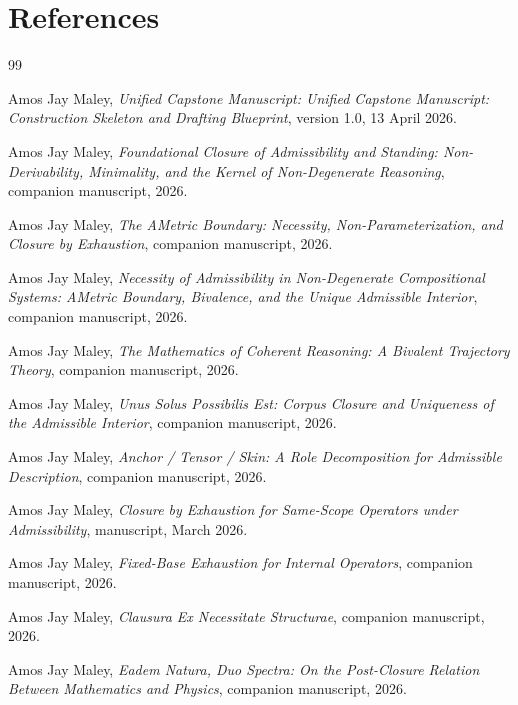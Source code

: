 \section{References}
\begin{thebibliography}{99}

Amos Jay Maley,
\newblock \emph{Unified Capstone Manuscript: Unified Capstone Manuscript: Construction Skeleton and Drafting Blueprint},
\newblock version 1.0, 13 April 2026.

Amos Jay Maley,
\newblock \emph{Foundational Closure of Admissibility and Standing: Non-Derivability, Minimality, and the Kernel of Non-Degenerate Reasoning},
\newblock companion manuscript, 2026.

Amos Jay Maley,
\newblock \emph{The AMetric Boundary: Necessity, Non-Parameterization, and Closure by Exhaustion},
\newblock companion manuscript, 2026.

Amos Jay Maley,
\newblock \emph{Necessity of Admissibility in Non-Degenerate Compositional Systems: AMetric Boundary, Bivalence, and the Unique Admissible Interior},
\newblock companion manuscript, 2026.

Amos Jay Maley,
\newblock \emph{The Mathematics of Coherent Reasoning: A Bivalent Trajectory Theory},
\newblock companion manuscript, 2026.

Amos Jay Maley,
\newblock \emph{Unus Solus Possibilis Est: Corpus Closure and Uniqueness of the Admissible Interior},
\newblock companion manuscript, 2026.

Amos Jay Maley,
\newblock \emph{Anchor / Tensor / Skin: A Role Decomposition for Admissible Description},
\newblock companion manuscript, 2026.



Amos Jay Maley,
\newblock \emph{Closure by Exhaustion for Same-Scope Operators under Admissibility},
\newblock manuscript, March 2026.

Amos Jay Maley,
\newblock \emph{Fixed-Base Exhaustion for Internal Operators},
\newblock companion manuscript, 2026.

Amos Jay Maley,
\newblock \emph{Clausura Ex Necessitate Structurae},
\newblock companion manuscript, 2026.

Amos Jay Maley,
\newblock \emph{Eadem Natura, Duo Spectra: On the Post-Closure Relation Between Mathematics and Physics},
\newblock companion manuscript, 2026.


\end{thebibliography}
